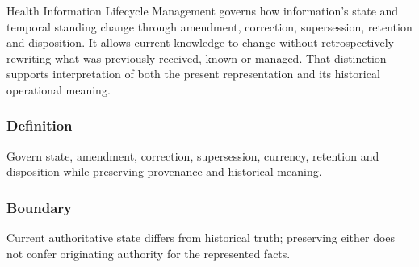 Health Information Lifecycle Management governs how information's state and temporal standing change through amendment, correction, supersession, retention and disposition. It allows current knowledge to change without retrospectively rewriting what was previously received, known or managed. That distinction supports interpretation of both the present representation and its historical operational meaning.

\subsubsection*{Definition}

Govern state, amendment, correction, supersession, currency, retention and disposition while preserving provenance and historical meaning.

\subsubsection*{Boundary}

Current authoritative state differs from historical truth; preserving either does not confer originating authority for the represented facts.

